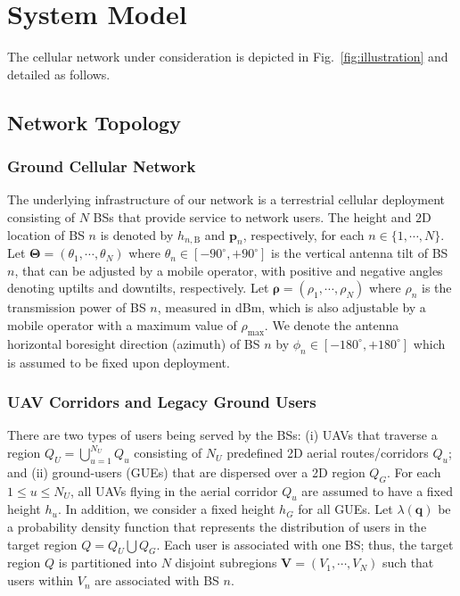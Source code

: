 \section{System Model}\label{System-Model}


The cellular network under consideration is depicted in Fig.~\ref{fig:illustration} and detailed as follows.


\subsection{Network Topology}\label{Network-Topology}


\subsubsection{Ground Cellular Network} The underlying infrastructure of our network is a terrestrial cellular deployment consisting of $N$ BSs that provide service to network users. The height and $2$D location of BS $n$ is denoted by $h_{n,\mathrm{B}}$ and $\bm{p}_n$, respectively, for each $n \in \{1, \cdots, N\}$. Let $\bm{\Theta} = (\theta_1, \cdots, \theta_N)$ where $\theta_n \in [-90^\circ, +90^\circ]$ is the vertical antenna tilt of BS $n$, that can be adjusted by a mobile operator, with positive and negative angles denoting uptilts and downtilts, respectively. Let $\bm{\rho} = (\rho_1, \cdots, \rho_N)$ where $\rho_n$ is the transmission power of BS $n$, measured in dBm, which is also adjustable by a mobile operator with a maximum value of $\rho_{\max}$. We denote the antenna horizontal boresight direction (azimuth) of BS $n$ by $\phi_n \in [-180^\circ, +180^\circ]$ which is assumed to be fixed upon deployment. 


\subsubsection{UAV Corridors and Legacy Ground Users} There are two types of users being served by the BSs: (i) UAVs that traverse a region $Q_U = \bigcup_{u=1}^{N_U} Q_u$ consisting of $N_U$ predefined 2D aerial routes/corridors $Q_u$; and (ii) ground-users (GUEs) that are dispersed over a 2D region $Q_G$. For each $1 \leq u \leq N_U$, all UAVs flying in the aerial corridor $Q_u$ are assumed to have a fixed height $h_u$. In addition, we consider a fixed height $h_G$ for all GUEs. Let $\lambda(\bm{q})$ be a probability density function that represents the distribution of users in the target region $Q = Q_U \bigcup Q_G$. Each user is associated with one BS; thus, the target region $Q$ is partitioned into $N$ disjoint subregions $\bm{V} = (V_1, \cdots, V_N)$ such that users within $V_n$ are associated with BS $n$.



